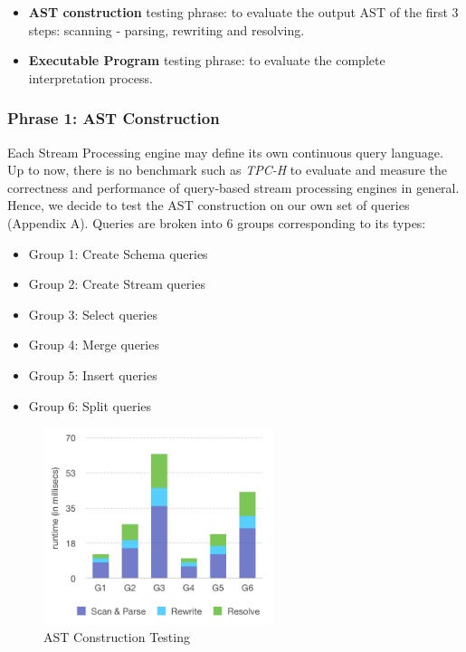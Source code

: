 \begin{itemize}
	\item \textbf{AST construction} testing phrase: to evaluate the output AST of the first 3 steps: scanning -  parsing, rewriting and resolving.
	\item \textbf{Executable Program} testing phrase: to evaluate the complete interpretation process.
\end{itemize}

\subsubsection{Phrase 1: AST Construction}
Each Stream Processing engine may define its own continuous query language. Up to now, there is no benchmark such as \textit{TPC-H} to evaluate and measure the correctness and performance of query-based stream processing engines in general. 
Hence, we decide to test the AST construction on our own set of queries (Appendix A). Queries are broken into 6 groups corresponding to its types: 
\begin{itemize}
	\item Group 1: Create Schema queries
	\item Group 2: Create Stream queries
	\item Group 3: Select queries
	\item Group 4: Merge queries
	\item Group 5: Insert queries
	\item Group 6: Split queries
\end{itemize} 

\begin{figure}[h!] 
\centering    
\includegraphics[width=0.6\textwidth]{ASTConstruction}
\caption{AST Construction Testing}
\label{fig:ASTConstruction}
\end{figure}

